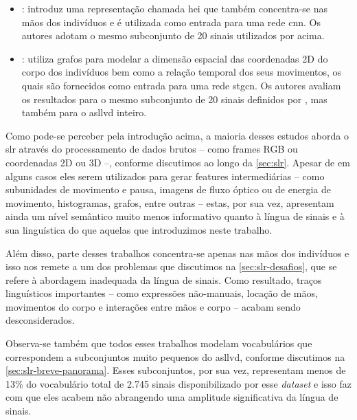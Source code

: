 \begin{itemize}
      \item \textbf{}: introduz uma representação chamada \acrfull{hei} que também concentra-se nas mãos dos indivíduos e é utilizada como entrada para uma rede \acrfull{cnn}.
            Os autores adotam o mesmo subconjunto de 20 sinais utilizados por  acima.

      \item \textbf{}: utiliza grafos para modelar a dimensão espacial das coordenadas 2D do corpo dos indivíduos bem como a relação temporal dos seus movimentos, os quais são fornecidos como entrada para uma rede \acrfull{stgcn}.
            Os autores avaliam os resultados para o mesmo subconjunto de 20 sinais definidos por , mas também para o \acrshort{asllvd} inteiro.
\end{itemize}


Como pode-se perceber pela introdução acima, a maioria desses estudos aborda o \acrshort{slr} através do processamento de dados brutos -- como frames RGB ou coordenadas 2D ou 3D --, conforme discutimos ao longo da \autoref{sec:slr}.
Apesar de em alguns casos eles serem utilizados para gerar features intermediárias -- como subunidades de movimento e pausa, imagens de fluxo óptico ou de energia de movimento, histogramas, grafos, entre outras -- estas, por sua vez, apresentam ainda um nível semântico muito menos informativo quanto à língua de sinais e à sua linguística do que aquelas que introduzimos neste trabalho.

Além disso, parte desses trabalhos concentra-se apenas nas mãos dos indivíduos e isso nos remete a um dos problemas que discutimos na \autoref{sec:slr-desafios}, que se refere à abordagem inadequada da língua de sinais. Como resultado, traços linguísticos importantes -- como expressões não-manuais, locação de mãos, movimentos do corpo e interações entre mãos e corpo -- acabam sendo desconsiderados.

Observa-se também que todos esses trabalhos modelam vocabulários que correspondem a subconjuntos muito pequenos do \acrshort{asllvd}, conforme discutimos na \autoref{sec:slr-breve-panorama}.
Esses subconjuntos, por sua vez, representam menos de 13\% do vocabulário total de 2.745 sinais disponibilizado por esse \textit{dataset} e isso faz com que eles acabem não abrangendo uma amplitude significativa da língua de sinais.

